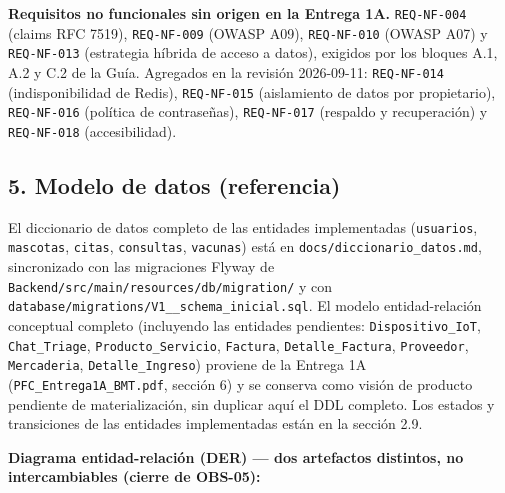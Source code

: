 \documentclass[
  spanish,
]{article}
\begin{document}
\textbf{Requisitos no funcionales sin origen en la Entrega 1A.}
\texttt{REQ-\allowbreak{}NF-\allowbreak{}004} (claims RFC 7519), \texttt{REQ-\allowbreak{}NF-\allowbreak{}009} (OWASP A09),
\texttt{REQ-\allowbreak{}NF-\allowbreak{}010} (OWASP A07) y \texttt{REQ-\allowbreak{}NF-\allowbreak{}013} (estrategia
híbrida de acceso a datos), exigidos por los bloques A.1, A.2 y C.2 de
la Guía. Agregados en la revisión 2026-09-11: \texttt{REQ-\allowbreak{}NF-\allowbreak{}014}
(indisponibilidad de Redis), \texttt{REQ-\allowbreak{}NF-\allowbreak{}015} (aislamiento de datos
por propietario), \texttt{REQ-\allowbreak{}NF-\allowbreak{}016} (política de contraseñas),
\texttt{REQ-\allowbreak{}NF-\allowbreak{}017} (respaldo y recuperación) y \texttt{REQ-\allowbreak{}NF-\allowbreak{}018}
(accesibilidad).

\subsection{5. Modelo de datos
(referencia)}\label{modelo-de-datos-referencia}

El diccionario de datos completo de las entidades implementadas
(\texttt{usuarios}, \texttt{mascotas}, \texttt{citas},
\texttt{consultas}, \texttt{vacunas}) está en
\texttt{docs/\allowbreak{}diccionario\_\allowbreak{}datos.\allowbreak{}md}, sincronizado con las migraciones
Flyway de \texttt{Backend/\allowbreak{}src/\allowbreak{}main/\allowbreak{}resources/\allowbreak{}db/\allowbreak{}migration/} y con
\texttt{database/\allowbreak{}migrations/\allowbreak{}V1\_\allowbreak{}\_\allowbreak{}schema\_\allowbreak{}inicial.\allowbreak{}sql}. El modelo
entidad-relación conceptual completo (incluyendo las entidades
pendientes: \texttt{Dispositivo\_\allowbreak{}Io\allowbreak{}T}, \texttt{Chat\_\allowbreak{}Triage},
\texttt{Producto\_\allowbreak{}Servicio}, \texttt{Factura},
\texttt{Detalle\_\allowbreak{}Factura}, \texttt{Proveedor}, \texttt{Mercaderia},
\texttt{Detalle\_\allowbreak{}Ingreso}) proviene de la Entrega 1A
(\texttt{PFC\_\allowbreak{}Entrega1\allowbreak{}A\_\allowbreak{}BMT.\allowbreak{}pdf}, sección 6) y se conserva como visión
de producto pendiente de materialización, sin duplicar aquí el DDL
completo. Los estados y transiciones de las entidades implementadas
están en la sección 2.9.

\textbf{Diagrama entidad-relación (DER) --- dos artefactos distintos, no
intercambiables (cierre de OBS-05):}
\end{document}
